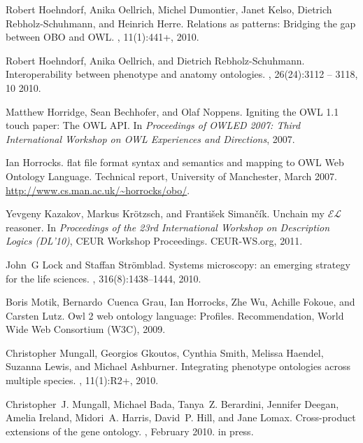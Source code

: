 \documentclass{bioinfo}
\begin{document}
\begin{thebibliography}{10}
Robert Hoehndorf, Anika Oellrich, Michel Dumontier, Janet Kelso, Dietrich
  Rebholz-Schuhmann, and Heinrich Herre.
\newblock Relations as patterns: Bridging the gap between {OBO} and {OWL}.
, 11(1):441+, 2010.

Robert Hoehndorf, Anika Oellrich, and Dietrich Rebholz-Schuhmann.
\newblock Interoperability between phenotype and anatomy ontologies.
, 26(24):3112 -- 3118, 10 2010.

Matthew Horridge, Sean Bechhofer, and Olaf Noppens.
\newblock Igniting the {OWL} 1.1 touch paper: The {OWL} {API}.
\newblock In {\em Proceedings of OWLED 2007: Third International Workshop on
  OWL Experiences and Directions}, 2007.

Ian Horrocks.
 flat file format syntax and semantics and mapping to {OWL}
  {W}eb {O}ntology {L}anguage.
\newblock Technical report, University of Manchester, March 2007.
\newblock \url{http://www.cs.man.ac.uk/~horrocks/obo/}.

Yevgeny Kazakov, Markus Kr{\"o}tzsch, and Franti\v{s}ek Siman\v{c}\'{i}k.
\newblock Unchain my $\mathcal{EL}$ reasoner.
\newblock In {\em Proceedings of the 23rd International Workshop on Description
  Logics (DL'10)}, CEUR Workshop Proceedings. CEUR-WS.org, 2011.

John~G Lock and Staffan Strömblad.
\newblock Systems microscopy: an emerging strategy for the life sciences.
, 316(8):1438--1444, 2010.

Boris Motik, Bernardo~Cuenca Grau, Ian Horrocks, Zhe Wu, Achille Fokoue, and
  Carsten Lutz.
\newblock Owl 2 web ontology language: Profiles.
\newblock Recommendation, World Wide Web Consortium (W3C), 2009.

Christopher Mungall, Georgios Gkoutos, Cynthia Smith, Melissa Haendel, Suzanna
  Lewis, and Michael Ashburner.
\newblock Integrating phenotype ontologies across multiple species.
, 11(1):R2+, 2010.

Christopher~J. Mungall, Michael Bada, Tanya~Z. Berardini, Jennifer Deegan,
  Amelia Ireland, Midori~A. Harris, David~P. Hill, and Jane Lomax.
\newblock Cross-product extensions of the gene ontology.
, February 2010.
\newblock in press.


\end{thebibliography}
\end{document}
